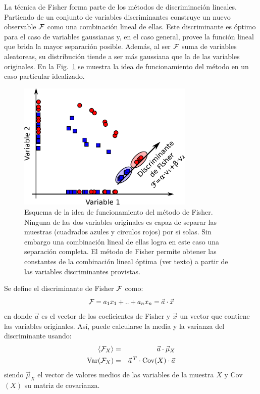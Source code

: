 	La técnica de Fisher forma parte de los métodos de discriminación lineales.
	Partiendo de un conjunto de variables discriminantes construye un nuevo observable ${\cal F}$ como una combinación lineal de ellas.
	Este discriminante es óptimo para el caso de variables gaussianas y, en el caso general, provee la función lineal que brida la mayor separación posible.
	Además, al ser ${\cal F}$ suma de variables aleatoreas, su distribución tiende a ser más gaussiana que la de las variables originales.
	En la Fig.~\ref{fig:ideaFisher} se muestra la idea de funcionamiento del método en un caso particular idealizado.
	\begin{figure}[ht]
	\begin{center}
	\includegraphics[width=0.75\textwidth]{fig/seleccionAuger/ideaFisher}
	\caption{Esquema de la idea de funcionamiento del método de Fisher. Ninguna de las dos variables originales es capaz de separar las muestras (cuadrados azules y circulos rojos) por si solas. Sin embargo una combinación lineal de ellas logra en este caso una separación completa. El método de Fisher permite obtener las constantes de la combinación lineal óptima (ver texto) a partir de las variables discriminantes provistas.}
	\label{fig:ideaFisher}
	\end{center}
	\end{figure}

	Se define el discriminante de Fisher ${\cal F}$ como:
	\begin{equation}
	{\cal F} = a_1 x_1 + .. + a_n x_n = \vec{a}\cdot \vec{x}
	\end{equation}
	en donde $\vec{a}$ es el vector de los coeficientes de Fisher y $\vec{x}$ un vector que contiene las variables originales.
	Así, puede calcularse la media y la varianza del discriminante usando:
	\begin{eqnarray}
	\langle{\cal F}_X\rangle &=& \vec{a}\cdot\vec{\mu}_X \\
	\text{Var}({\cal F}_X)   &=& \vec{a}^{\,T} \cdot \text{Cov}(X) \cdot\vec{a}
	\end{eqnarray}
	siendo $\vec{\mu}_X$ el vector de valores medios de las variables de la muestra $X$ y Cov$(X)$ su matriz de covarianza.

